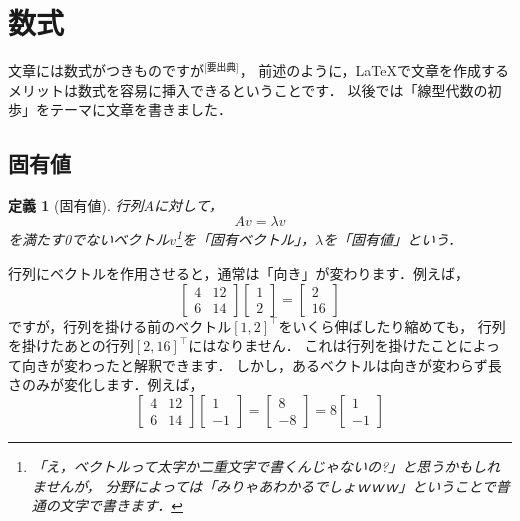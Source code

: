 \documentclass[a4j, uplatex, dvipdfmx]{jsarticle}
\newtheorem{defi}{定義}[section]
\begin{document}
\section{数式}
  文章には数式がつきものですが$^\text{[要出典]}$，
  前述のように，\LaTeX で文章を作成するメリットは数式を容易に挿入できるということです．
  以後では「線型代数の初歩」をテーマに文章を書きました．
  \subsection{固有値}
      \begin{defi}[固有値]
        行列$A$に対して，
          \[
            Av = \lambda v
          \]
        を満たす0でないベクトル$v$\footnote{
            「え，ベクトルって太字か二重文字で書くんじゃないの?」と思うかもしれませんが，
            分野によっては「みりゃあわかるでしょｗｗｗ」ということで普通の文字で書きます．
          }を「固有ベクトル」，$\lambda$を「固有値」という．
      \end{defi}
    行列にベクトルを作用させると，通常は「向き」が変わります．例えば，
      \begin{equation}
        \begin{bmatrix}
          4 & 12 \\
          6 & 14
        \end{bmatrix}
        \begin{bmatrix}
          1 \\ 2
        \end{bmatrix} =
          \begin{bmatrix}
            2 \\ 16
          \end{bmatrix}
      \end{equation}
    ですが，行列を掛ける前のベクトル$[1, 2]^\top$をいくら伸ばしたり縮めても，
    行列を掛けたあとの行列$[2, 16]^\top$にはなりません．
    これは行列を掛けたことによって向きが変わったと解釈できます．
    しかし，あるベクトルは向きが変わらず長さのみが変化します．例えば，
      \begin{equation}
        \begin{bmatrix}
          4 & 12 \\
          6 & 14
        \end{bmatrix}
        \begin{bmatrix}
          1 \\ -1
        \end{bmatrix} =
          \begin{bmatrix}
            8 \\ -8
          \end{bmatrix} = 8
            \begin{bmatrix}
              1 \\ -1
            \end{bmatrix}
      \end{equation}
\end{document}
